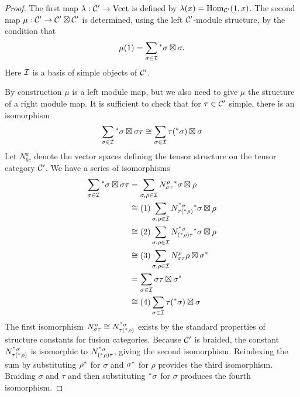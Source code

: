 \documentclass{amsart}
\begin{document}
\begin{proof}
The first map $\lambda : \mathcal C' \rightarrow \mathrm{Vect}$ is defined by $\lambda(x) = \operatorname{Hom}_{\mathcal C'}(1,x)$.  The second map $\mu : \mathcal C' \rightarrow \mathcal C' \boxtimes \mathcal C'$ is determined, using the left $\mathcal C'$-module structure, by the condition that
$$\mu(1) = \sum_{\sigma \in \mathcal I} {}^*{\sigma} \boxtimes \sigma.$$
Here $\mathcal I$ is a basis of simple objects of $\mathcal C'$.

By construction $\mu$ is a left module map, but we also need to give $\mu$ the structure of a right module map.  It is sufficient to check that for $\tau \in \mathcal C'$ simple, there is an isomorphism
$$\sum_{\sigma \in \mathcal I} {{}^*{\sigma}} \boxtimes \sigma \tau  \cong  \sum_{\sigma \in \mathcal I} \tau {({}^*{\sigma})} \boxtimes \sigma$$
Let $N^a_{bc}$ denote the vector spaces defining the tensor structure on the tensor category $\mathcal C'$.  We have a series of isomorphisms
\begin{align}
\sum_{\sigma \in \mathcal I} {{}^*{\sigma}} \boxtimes \sigma \tau
& =
\sum_{\sigma,\rho \in \mathcal I} N^{\rho}_{\sigma \tau} {{}^*{\sigma} \boxtimes \rho} \nonumber \\
& \cong{(1)}
\sum_{\sigma,\rho \in \mathcal I} N^{{}^*{\sigma}}_{\tau {({}^*{\rho}})} {{}^*{\sigma} \boxtimes \rho} \nonumber \\
& \cong{(2)}
\sum_{\sigma,\rho \in \mathcal I} N^{{}^*{\sigma}}_{{({}^*{\rho})} \tau} {{}^*{\sigma} \boxtimes \rho} \nonumber \\
& \cong{(3)}
\sum_{\sigma,\rho \in \mathcal I} N^{\rho}_{\sigma \tau} {\rho \boxtimes {\sigma}^*} \nonumber \\
& =
\sum_{\sigma \in \mathcal I} \sigma \tau \boxtimes {{\sigma}^*} \nonumber \\
& \cong{(4)}
\sum_{\sigma \in \mathcal I} \tau {({}^*{\sigma})} \boxtimes \sigma \nonumber 
\end{align}
The first isomorphism $N^{\rho}_{\sigma \tau} \cong N^{{}^*{\sigma}}_{\tau {({}^*{\rho}})}$ exists by the standard properties of structure constants for fusion categories. 
Because $\mathcal C'$ is braided, the constant $N^{{}^*{\sigma}}_{\tau {({}^*{\rho}})}$ is isomorphic to $N^{{}^*{\sigma}}_{{({}^*{\rho}}) \tau}$, giving the second isomorphism.  Reindexing the sum by substituting ${\rho}^*$ for $\sigma$ and ${\sigma}^*$ for $\rho$ provides the third isomorphism.  Braiding $\sigma$ and $\tau$ and then substituting ${}^*{\sigma}$ for $\sigma$ produces the fourth isomorphism.  


\end{proof}
\end{document}
